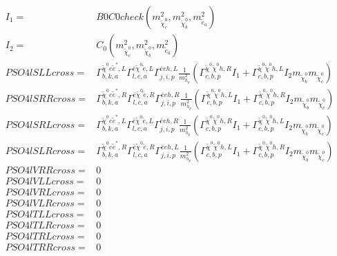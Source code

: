 \documentclass[A4,landscape]{article}
\begin{document}
\begin{align} 
I_1= & B0C0check(m^2_{\tilde{\chi}^0_{{c}}}, m^2_{\tilde{\chi}^0_{{b}}}, m^2_{\tilde{e}_{{a}}}) \\ 
I_2= & C_0(m^2_{\tilde{\chi}^0_{{c}}}, m^2_{\tilde{\chi}^0_{{b}}}, m^2_{\tilde{e}_{{a}}}) \\ 
  PSO4lSLLcross= &  \Gamma^{\tilde{\chi}^0 e \tilde{e}^*,L}_{b, k, a} \Gamma^{\bar{e}\tilde{\chi}^0 \tilde{e} ,L}_{l, c, a} \Gamma^{\bar{e}e h ,L}_{j, i, p} \frac{1}{m^2_{h_{{p}}}} (\Gamma^{\tilde{\chi}^0 \tilde{\chi}^0 h ,R}_{c, b, p} I_1 + \Gamma^{\tilde{\chi}^0 \tilde{\chi}^0 h ,L}_{c, b, p} I_2 m_{\tilde{\chi}^0_{{b}}} m_{\tilde{\chi}^0_{{c}}}) \\ 
  PSO4lSRRcross= &  \Gamma^{\tilde{\chi}^0 e \tilde{e}^*,R}_{b, k, a} \Gamma^{\bar{e}\tilde{\chi}^0 \tilde{e} ,R}_{l, c, a} \Gamma^{\bar{e}e h ,R}_{j, i, p} \frac{1}{m^2_{h_{{p}}}} (\Gamma^{\tilde{\chi}^0 \tilde{\chi}^0 h ,L}_{c, b, p} I_1 + \Gamma^{\tilde{\chi}^0 \tilde{\chi}^0 h ,R}_{c, b, p} I_2 m_{\tilde{\chi}^0_{{b}}} m_{\tilde{\chi}^0_{{c}}}) \\ 
  PSO4lSRLcross= &  \Gamma^{\tilde{\chi}^0 e \tilde{e}^*,L}_{b, k, a} \Gamma^{\bar{e}\tilde{\chi}^0 \tilde{e} ,L}_{l, c, a} \Gamma^{\bar{e}e h ,R}_{j, i, p} \frac{1}{m^2_{h_{{p}}}} (\Gamma^{\tilde{\chi}^0 \tilde{\chi}^0 h ,R}_{c, b, p} I_1 + \Gamma^{\tilde{\chi}^0 \tilde{\chi}^0 h ,L}_{c, b, p} I_2 m_{\tilde{\chi}^0_{{b}}} m_{\tilde{\chi}^0_{{c}}}) \\ 
  PSO4lSLRcross= &  \Gamma^{\tilde{\chi}^0 e \tilde{e}^*,R}_{b, k, a} \Gamma^{\bar{e}\tilde{\chi}^0 \tilde{e} ,R}_{l, c, a} \Gamma^{\bar{e}e h ,L}_{j, i, p} \frac{1}{m^2_{h_{{p}}}} (\Gamma^{\tilde{\chi}^0 \tilde{\chi}^0 h ,L}_{c, b, p} I_1 + \Gamma^{\tilde{\chi}^0 \tilde{\chi}^0 h ,R}_{c, b, p} I_2 m_{\tilde{\chi}^0_{{b}}} m_{\tilde{\chi}^0_{{c}}}) \\ 
  PSO4lVRRcross= & 0 \\ 
  PSO4lVLLcross= & 0 \\ 
  PSO4lVRLcross= & 0 \\ 
  PSO4lVLRcross= & 0 \\ 
  PSO4lTLLcross= & 0 \\ 
  PSO4lTLRcross= & 0 \\ 
  PSO4lTRLcross= & 0 \\ 
  PSO4lTRRcross= & 0 \\ 
\end{align} 
\end{document}
